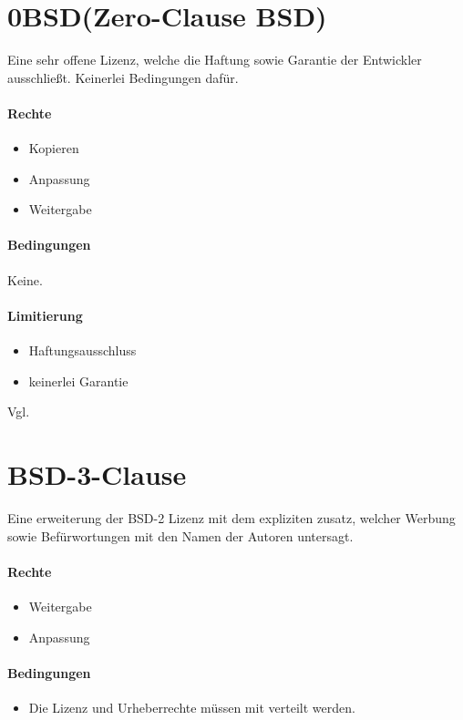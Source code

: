 \section{0BSD(Zero-Clause BSD)}
Eine sehr offene Lizenz, welche die Haftung sowie Garantie der Entwickler ausschließt.
Keinerlei Bedingungen dafür.

\paragraph{Rechte}
\begin{itemize}
    \item Kopieren
    \item Anpassung
    \item Weitergabe
\end{itemize}
\paragraph{Bedingungen}
Keine.

\paragraph{Limitierung}
\begin{itemize}
    \item Haftungsausschluss
    \item keinerlei Garantie
\end{itemize}

Vgl. \cite{bsd-0-clause}

\section{BSD-3-Clause}
Eine erweiterung der BSD-2 Lizenz mit dem expliziten zusatz, welcher Werbung sowie Befürwortungen
mit den Namen der Autoren untersagt.

\paragraph{Rechte}
\begin{itemize}
    \item Weitergabe
    \item Anpassung
\end{itemize}
\paragraph{Bedingungen}
\begin{itemize}
    \item Die Lizenz und Urheberrechte müssen mit verteilt werden.
\end{itemize}

